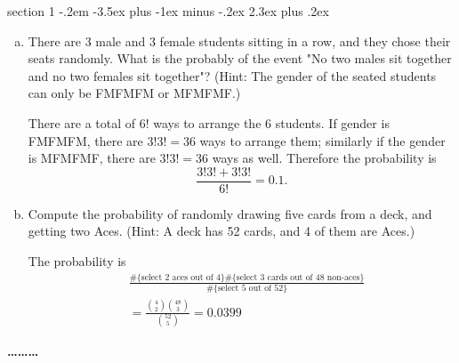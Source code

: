 \documentclass[answers,11pt]{exam}
\makeatletter
\newenvironment{problem}{\@startsection
       {section}
       {1}
       {-.2em}
       {-3.5ex plus -1ex minus -.2ex}
       {2.3ex plus .2ex}
       {\pagebreak[3]%
       \large\bf\noindent{Problem }
       }
       }
       {%
       \begin{center}\large\bf \ldots\ldots\ldots\end{center}}
\makeatother
\begin{document}
\begin{problem}{}
\begin{enumerate}[(a)]
\item There are 3 male and 3 female students sitting in a row, and they chose their seats randomly. What is the probably of the event "No two males sit together and no two females sit together"?
(Hint: The gender of the seated students can only be FMFMFM or MFMFMF.)
\begin{solution}
There are a total of $6!$ ways to arrange the 6 students. If gender is FMFMFM, there are $3!3!=36$ ways to arrange them;
similarly if the gender is MFMFMF, there are $3!3!=36$ ways as well. Therefore the probability is 
$$ \frac{3!3!+3!3!}{6!}=0.1.$$
\end{solution}
\item Compute the probability of randomly drawing five cards from a deck, and getting two Aces. (Hint: A deck has 52 cards, and 4 of them are Aces.) 
\begin{solution}
The probability is 
\begin{align*}
&\frac{\#\{\text{select 2 aces out of 4}\}\#\{\text{select 3 cards out of 48 non-aces}\}}
{\#\{\text{select 5 out of 52}\}} \\
&=\frac{\binom{4}{2} \binom{48}{3}}{\binom{52}{5}} = 0.0399
\end{align*}
\end{solution}
\end{enumerate}
\end{problem}
\end{document}
